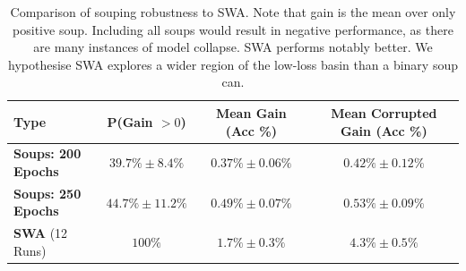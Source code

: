 \begin{table}[ht]
\centering
\begin{tabular}{l c c c}
\toprule
\textbf{Type} & \textbf{P(Gain $> 0$)} & \textbf{Mean Gain} \textbf{(Acc \%)} & \textbf{Mean Corrupted Gain} \textbf{(Acc \%)} \\
\midrule
\textbf{Soups: 200 Epochs} & $39.7\% \pm 8.4\%$ & $0.37\% \pm 0.06\%$ & $0.42\% \pm 0.12\%$ \\
\addlinespace
\textbf{Soups: 250 Epochs} & $44.7\% \pm 11.2\%$ & $0.49\% \pm 0.07\%$ & $0.53\% \pm 0.09\%$ \\
\addlinespace
\textbf{SWA} (12 Runs) & $100\%$ & $1.7\% \pm 0.3\%$ & $4.3\% \pm 0.5\%$ \\
\bottomrule
\end{tabular}
\caption{Comparison of souping robustness to SWA. Note that gain is the mean over only positive soup. Including all soups would result in negative performance, as there are many instances of model collapse. SWA performs notably better. We hypothesise SWA explores a wider region of the low-loss basin than a binary soup can.}
\label{tab:swa_compare}
\end{table}




